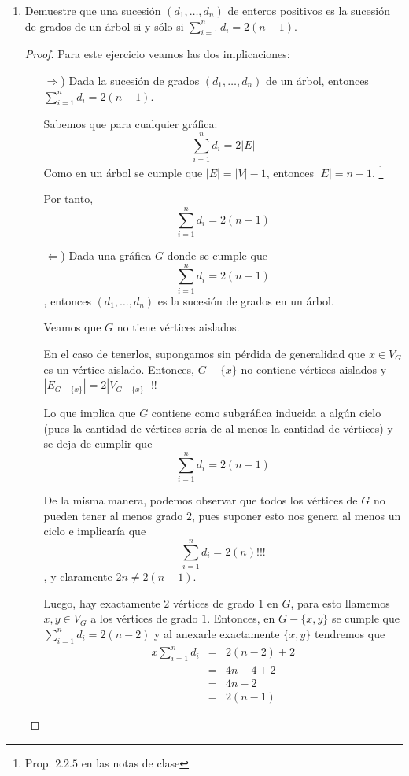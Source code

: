 \documentclass{article}
\begin{document}
\begin{enumerate}
    \item Demuestre que una sucesi\'on $(d_1, \dots,
      d_n)$ de enteros positivos es la sucesi\'on de
      grados de un \'arbol si y s\'olo si
      $\sum_{i=1}^n d_i = 2(n-1)$.

      \renewcommand\qedsymbol{QED}
      \begin{proof}
        Para este ejercicio veamos las dos implicaciones:
        \begin{itemize}
          \item[$\Rightarrow$)] Dada la sucesi\'on de grados $(d_1, \dots, d_n)$ de un
            \'arbol, entonces $\displaystyle \sum_{i=1}^n d_i = 2(n-1)$.

            Sabemos que para cualquier gr\'afica:
            \[
            \sum_{i=1}^n d_i = 2|E|
            \]
            Como en un \'arbol se cumple que $|E| = |V| - 1$, entonces $|E| = n - 1$. \footnote{Prop. $2.2.5$ en las
            notas de clase}

            Por tanto,
            \[
            \sum_{i=1}^n d_i = 2(n - 1)
            \]

          \item[$\Leftarrow$)] Dada una gr\'afica $G$ donde se cumple que
            $$\displaystyle \sum_{i=1}^n d_i = 2(n-1)$$
            , entonces $(d_1, \dots, d_n)$ es la sucesi\'on de grados en un \'arbol.

            Veamos que $G$ no tiene v\'ertices aislados.

            En el caso de tenerlos, supongamos sin p\'erdida de generalidad que
            $x \in V_G$ es un v\'ertice aislado. Entonces, $G - \{x\}$ no contiene
            v\'ertices aislados
            y $|E_{G - \{x\}}| = 2|V_{G - \{x\}}|$ !!

            Lo que implica que $G$ contiene como subgr\'afica inducida a alg\'un
            ciclo (pues la cantidad de v\'ertices ser\'ia de al menos la cantidad
            de v\'ertices) y se deja de cumplir que
            $$\displaystyle \sum_{i=1}^n d_i = 2(n-1)$$

            De la misma manera, podemos observar que todos los v\'ertices
            de $G$ no pueden tener al menos grado $2$, pues suponer esto nos genera
            al menos un ciclo e implicar\'ia que
            $$\displaystyle \sum_{i=1}^n d_i = 2(n) \text{!!!}$$
            , y claramente $2n \not= 2(n - 1)$.

            Luego, hay exactamente $2$ v\'ertices de grado $1$ en $G$, para esto
            llamemos $x, y \in V_G$ a los v\'ertices de grado $1$. Entonces, en
            $G -\{x, y\}$ se cumple que $\displaystyle \sum_{i=1}^n d_i = 2(n-2)$
            y al anexarle exactamente $\{x, y\}$ tendremos que
            \begin{eqnarray*}x
              \sum_{i=1}^n d_i &=& 2(n-2) + 2\\
              &=& 4n - 4 + 2\\
              &=& 4n - 2\\
              &=& 2(n - 1)
            \end{eqnarray*}


\end{itemize}
\end{proof}
\end{enumerate}
\end{document}
